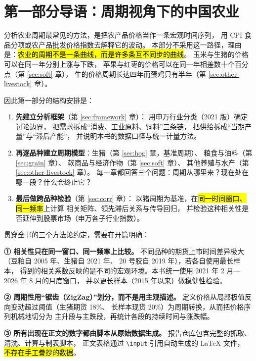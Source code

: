 \section*{第一部分导语：周期视角下的中国农业}

分析农业周期最常见的方法，是把农产品价格当作一条宏观时间序列，
用 CPI 食品分项或农产品批发价格指数去解释它的波动。
本部分不采用这一路径，理由是：\hl{农业的周期不是一条曲线，而是许多条互不同步的曲线}。
玉米与生猪的价格可以在同一年分别上涨与下跌，
苹果与红枣的价格可以在同一年相差数十个百分点（第 \ref{sec:soft} 章），
牛的价格周期长达四年而蛋鸡只有半年（第 \ref{sec:other-livestock} 章）。

因此第一部分的结构安排是：
\begin{enumerate}[leftmargin=1.5em, itemsep=2pt]
  \item \textbf{先建立分析框架}（第 \ref{sec:framework} 章）：
        用申万行业分类（2021 版）确定讨论边界，
        把需求拆成“消费、工业原料、饲料”三条链，
        把供给拆成“当期产量”与“滞后产能”，
        并说明本书的数据口径与统一计量方法。
  \item \textbf{再逐品种建立周期模型}：生猪（第 \ref{sec:hog} 章，基准周期）、
        粮食与油料（第 \ref{sec:grain} 章）、
        软商品与经济作物（第 \ref{sec:soft} 章）、
        其他养殖与水产（第 \ref{sec:other-livestock} 章）。
        每一章都回答三个问题：周期从哪里来？现在处在哪一段？什么会终止它？
  \item \textbf{最后做跨品种检验}（第 \ref{sec:corr} 章）：
        以猪周期为基准，在\hl{同一时间窗口、同一频率}上计算
        相关矩阵、领先滞后关系与传导回归，
        并检验这种相关性是否延伸到股票市场（申万各子行业指数）。
\end{enumerate}

贯穿全书的三个方法论约定，需要在开篇明确：

\noindent\textbf{① 相关性只在同一窗口、同一频率上比较。}
不同品种的期货上市时间差异极大（豆粕自 \num{2005} 年、生猪自 \num{2021} 年、
20 号胶自 \num{2019} 年），若各自使用最长样本，
得到的相关系数反映的是不同的宏观环境。本书统一使用
\num{2021} 年 2 月---\num{2026} 年 8 月的月度窗口，
并以更长样本（\num{2015} 年以来）做稳健性检验。

\noindent\textbf{② 周期性用“锯齿（ZigZag）”划分，而不是用主观描述。}
定义价格从局部极值反向变动超过阈值（生猪期货 \num{18}\%、
长样本现货 \num{20}\%）为周期转换，从而把价格序列机械地切分为
主升段与主跌段，再统计各段的持续时间与涨跌幅。

\noindent\textbf{③ 所有出现在正文的数字都由脚本从原始数据生成。}
报告仓库包含完整的抓取、清洗、计算与制表脚本，
正文表格通过 \texttt{\textbackslash input} 引用自动生成的 \LaTeX{} 文件，
\hl{不存在手工誊抄的数据}。
\clearpage
